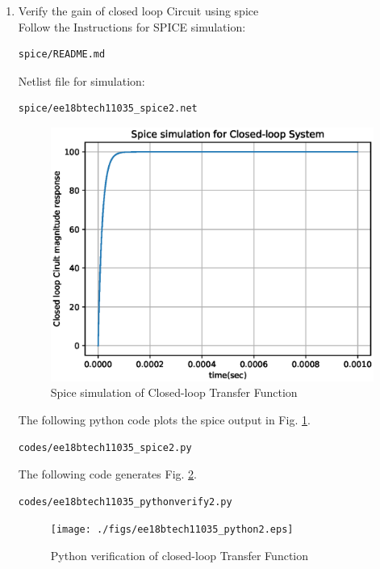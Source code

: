 \begin{enumerate}[label=\arabic*.,ref=\theenumi]
\item Verify the gain of closed loop Circuit using spice\\
\solution Follow the Instructions for SPICE simulation:
\begin{lstlisting}
spice/README.md
\end{lstlisting}
Netlist file for simulation:
\begin{lstlisting}
spice/ee18btech11035_spice2.net
\end{lstlisting}

\renewcommand{\thefigure}{\theenumi.\arabic{figure}}
\begin{figure}[!h]
  \includegraphics[width=\columnwidth]{./figs/ee18btech11035_spice2.eps}
  \caption{Spice simulation of Closed-loop Transfer Function}
  \label{fig:ee18btech11035_spice2}
\end{figure}


The following python code plots the spice output in Fig.   \ref{fig:ee18btech11035_spice2}.
%
\begin{lstlisting}
codes/ee18btech11035_spice2.py
\end{lstlisting}


The following  code generates Fig.   \ref{fig:ee18btech11035_pv2}.
%
\begin{lstlisting}
codes/ee18btech11035_pythonverify2.py
\end{lstlisting}
%
\begin{figure}[!h]
  \texttt{[image: ./figs/ee18btech11035\_python2.eps]}
  \caption{Python verification of closed-loop Transfer Function}
  \label{fig:ee18btech11035_pv2}
\end{figure}

\renewcommand{\thefigure}{\theenumi}






\end{enumerate}
